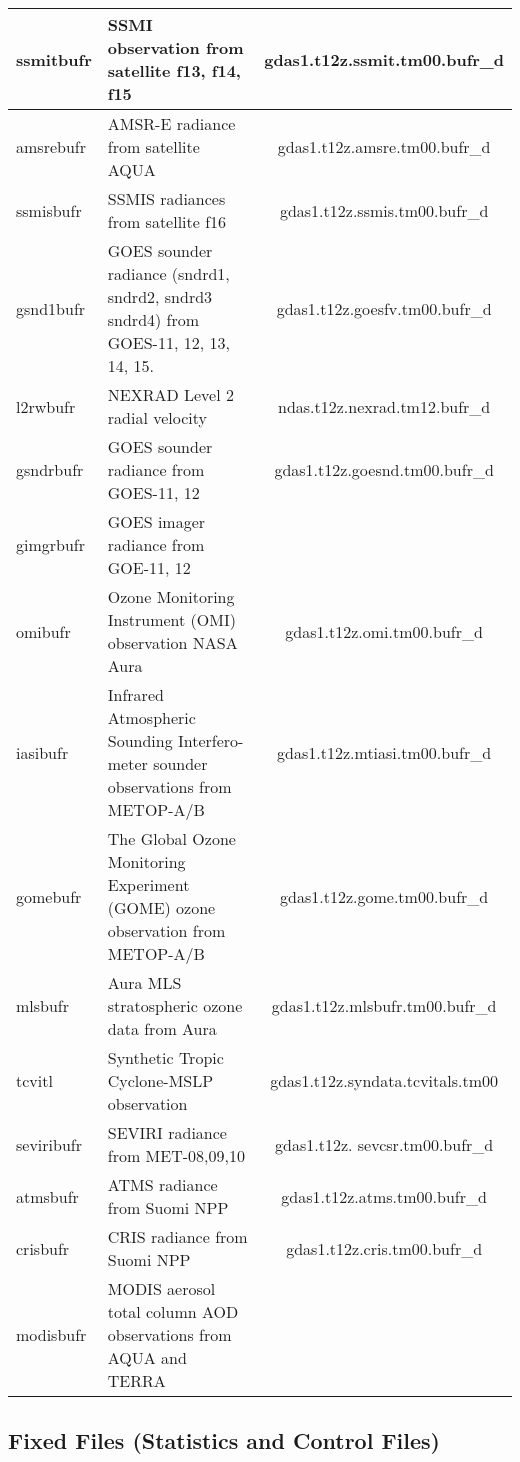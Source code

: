 \begin{table}[htbp]
\begin{footnotesize}
\begin{tabular}{|l|p{7cm}|c|}
\hline
ssmitbufr &	SSMI observation from satellite f13, f14, f15 &	gdas1.t12z.ssmit.tm00.bufr\_d \\
\hline
amsrebufr &	AMSR-E radiance from satellite AQUA	& gdas1.t12z.amsre.tm00.bufr\_d \\
\hline
ssmisbufr &	SSMIS radiances from satellite f16	& gdas1.t12z.ssmis.tm00.bufr\_d \\
\hline
gsnd1bufr &	GOES sounder radiance (sndrd1, sndrd2, sndrd3 sndrd4) from GOES-11, 12, 13, 14, 15. &	gdas1.t12z.goesfv.tm00.bufr\_d \\
\hline
l2rwbufr &	NEXRAD Level 2 radial velocity & ndas.t12z.nexrad.tm12.bufr\_d \\
\hline
gsndrbufr &	GOES sounder radiance from GOES-11, 12 &	gdas1.t12z.goesnd.tm00.bufr\_d \\
\hline
gimgrbufr &	GOES imager radiance from GOE-11, 12 & \\
\hline	
omibufr	& Ozone Monitoring Instrument (OMI) observation NASA Aura &	gdas1.t12z.omi.tm00.bufr\_d \\
\hline
iasibufr &	Infrared Atmospheric Sounding Interfero-meter sounder observations from METOP-A/B	& gdas1.t12z.mtiasi.tm00.bufr\_d \\
\hline
gomebufr &	The Global Ozone Monitoring Experiment (GOME) ozone observation from METOP-A/B & gdas1.t12z.gome.tm00.bufr\_d \\
\hline
mlsbufr	 & Aura MLS stratospheric ozone data from Aura &	gdas1.t12z.mlsbufr.tm00.bufr\_d \\
\hline
tcvitl & Synthetic Tropic Cyclone-MSLP observation &	gdas1.t12z.syndata.tcvitals.tm00 \\
\hline
seviribufr & SEVIRI radiance from MET-08,09,10 & gdas1.t12z. sevcsr.tm00.bufr\_d \\
\hline
atmsbufr & ATMS radiance from Suomi NPP & gdas1.t12z.atms.tm00.bufr\_d \\
\hline
crisbufr & CRIS radiance from Suomi NPP	& gdas1.t12z.cris.tm00.bufr\_d \\
\hline
modisbufr &	MODIS aerosol total column AOD observations from AQUA and TERRA & \\	
\hline
\end{tabular}
\label{t31}
\end{footnotesize}
\end{table}

\subsection{Fixed Files (Statistics and Control Files)}

